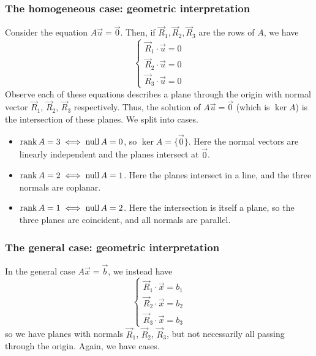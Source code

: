 \documentclass{../template/note}
\begin{document}

    \subsubsection{The homogeneous case: geometric interpretation}

    Consider the equation \(A \vec u = \vec 0\). Then, if \(\vec R_1, \vec R_2, \vec R_3\) are the rows of \(A\), we have
    \[
        \begin{cases}
            \vec R_1 \cdot \vec u = 0 \\
            \vec R_2 \cdot \vec u = 0 \\
            \vec R_3 \cdot \vec u = 0
        \end{cases}
    \]
    Observe each of these equations describes a plane through the origin with normal vector \(\vec R_1\), \(\vec R_2\), \(\vec R_3\) respectively. Thus, the solution of \(A \vec u = \vec 0\) (which is \(\ker A\)) is the intersection of these planes. We split into cases.
    \begin{itemize}
        \item \(\operatorname{rank} A = 3 \iff \operatorname{null} A = 0\), so \(\ker A = \{\vec 0\}\). Here the normal vectors are linearly independent and the planes intersect at \(\vec 0\).
        \item \(\operatorname{rank} A = 2 \iff \operatorname{null} A = 1\). Here the planes intersect in a line, and the three normals are coplanar.
        \item \(\operatorname{rank} A = 1 \iff \operatorname{null} A = 2\). Here the intersection is itself a plane, so the three planes are coincident, and all normals are parallel.
    \end{itemize}
    
    \subsubsection{The general case: geometric interpretation}

    In the general case \(A \vec x = \vec b\), we instead have
    \[
        \begin{cases}
            \vec R_1 \cdot \vec x = b_1 \\
            \vec R_2 \cdot \vec x = b_2 \\
            \vec R_3 \cdot \vec x = b_3
        \end{cases}
    \]
    so we have planes with normals \(\vec R_1\), \(\vec R_2\), \(\vec R_3\), but not necessarily all passing through the origin. Again, we have cases.
\end{document}
